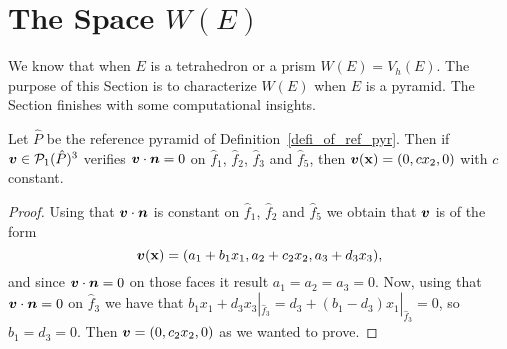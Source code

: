 \section{The Space $W(E)$}
We know that when $E$ is a tetrahedron or a prism $W(E)=V_h(E)$. The purpose of this Section is to characterize $W(E)$ when $E$ is a pyramid. The Section finishes with some computational insights. 
\begin{lemma}\label{L3}
Let $\hat P$ be the reference pyramid 
of Definition~\ref{defi_of_ref_pyr}.
Then if $\boldsymbol{v} \in\mathcal P_1(\hat P)^3$ verifies $\boldsymbol{v} \cdot \boldsymbol{n} =0$ on $\hat f_1$, $\hat f_2$, $\hat f_3$ and
$\hat f_5$, then $\boldsymbol{v}({\bf x})=(0,cx_2,0)$ with $c$ constant.
\end{lemma}
\begin{proof}
Using that $\boldsymbol{v}\cdot\boldsymbol{n}$ is constant on $\hat f_1$, $\hat f_2$ and
$\hat f_5$ we obtain that $\boldsymbol{v}$ is of the form
\[
\boldsymbol{v}({\bf x}) = (a_1+b_1x_1, a_2+c_2x_2,a_3+d_3x_3),
\]
and since $\boldsymbol{v}\cdot\boldsymbol{n}=0$ on those faces it result
$a_1=a_2=a_3=0$. Now, using that $\boldsymbol{v}\cdot\boldsymbol{n}=0$ on
$\hat f_3$  we have that $b_1x_1+d_3x_3|_{\hat f_3}=d_3+(b_1-d_3)x_1|_{\hat f_3}=0$, so $b_1=d_3=0$. Then $\boldsymbol{v}=(0,c_2x_2,0)$ as we wanted to prove.
\end{proof}

